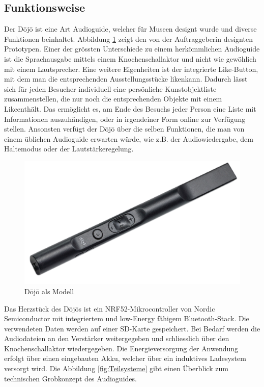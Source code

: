 \subsection{Funktionsweise} \label{sec:funktionsweise}
Der Dōjō ist eine Art Audioguide, welcher für Museen designt wurde und diverse Funktionen beinhaltet. Abbildung \ref{fig:Funktion Dojo} zeigt den von der Auftraggeberin designten Prototypen. Einer der grössten Unterschiede zu einem herkömmlichen Audioguide ist die Sprachausgabe mittels einem Knochenschallaktor und nicht wie gewöhlich mit einem Lautsprecher. Eine weitere Eigenheiten ist der integrierte \glqq Like\grqq-Button, mit dem man die entsprechenden Ausstellungsstücke \glqq liken\grqq kann. Dadurch lässt sich für jeden Besucher individuell eine persönliche Kunstobjektliste zusammenstellen, die nur noch die entsprechenden Objekte mit einem \glqq Like\grqq enthält. Das ermöglicht es, am Ende des Besuchs jeder Person eine Liste mit Informationen auszuhändigen, oder in irgendeiner Form online zur Verfügung stellen. Ansonsten verfügt der Dōjō über die selben Funktionen, die man von einem üblichen Audioguide erwarten würde, wie z.B. der Audiowiedergabe, dem Haltemodus oder der Lautstärkeregelung.

\begin{figure}[H]
	\begin{center}
		\includegraphics[width=140mm]{data/Dojo.png}
		\caption[Dōjō als Modell]{Dōjō als Modell} %
		\label{fig:Funktion Dojo}
	\end{center}
\end{figure}

Das Herzstück des Dōjōs ist ein NRF52-Mikrocontroller von Nordic Semiconductor mit integriertem und low-Energy fähigem Bluetooth-Stack. Die verwendeten Daten werden auf einer SD-Karte gespeichert. Bei Bedarf werden die Audiodateien an den Verstärker weitergegeben und schliesslich über den Knochenschallaktor wiedergegeben. Die Energieversorgung der Anwendung erfolgt über einen eingebauten Akku, welcher über ein induktives Ladesystem versorgt wird. Die Abbildung \ref{fig:Teilsysteme} gibt einen Überblick zum technischen Grobkonzept des Audioguides.


